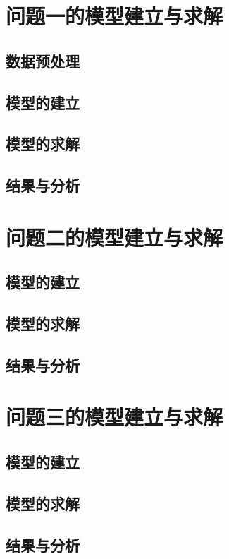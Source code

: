 \section{问题一的模型建立与求解}

\subsection{数据预处理}

\subsection{模型的建立}


\subsection{模型的求解}


\subsection{结果与分析}



\section{问题二的模型建立与求解}

\subsection{模型的建立}

\subsection{模型的求解}

\subsection{结果与分析}


\section{问题三的模型建立与求解}

\subsection{模型的建立}

\subsection{模型的求解}

\subsection{结果与分析}
